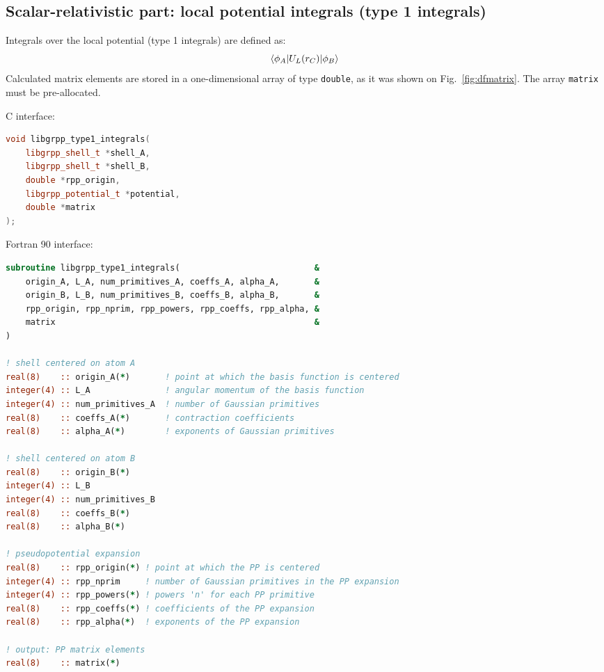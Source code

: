 \documentclass[12pt]{article}
\begin{document}
\subsection{Scalar-relativistic part: local potential integrals (type 1 integrals)}
\label{sec:type1-integrals}

Integrals over the local potential (type 1 integrals) are defined as:
%
\begin{equation}
\braket{\phi_A|U_L(r_C)|\phi_B}
\label{eq:def-type1-ints}
\end{equation}
%
Calculated matrix elements are stored in a one-dimensional array of type \texttt{double}, as it was shown on Fig.~\ref{fig:dfmatrix}. The array \texttt{matrix} must be pre-allocated.

C interface:
%
\begin{lstlisting}[language=C++]
void libgrpp_type1_integrals(
    libgrpp_shell_t *shell_A,
    libgrpp_shell_t *shell_B,
    double *rpp_origin,
    libgrpp_potential_t *potential,
    double *matrix
);
\end{lstlisting}

Fortran 90 interface:
%
\begin{lstlisting}[language=Fortran]
subroutine libgrpp_type1_integrals(                           &
    origin_A, L_A, num_primitives_A, coeffs_A, alpha_A,       &
    origin_B, L_B, num_primitives_B, coeffs_B, alpha_B,       &
    rpp_origin, rpp_nprim, rpp_powers, rpp_coeffs, rpp_alpha, &
    matrix                                                    & 
)

! shell centered on atom A
real(8)    :: origin_A(*)       ! point at which the basis function is centered
integer(4) :: L_A               ! angular momentum of the basis function
integer(4) :: num_primitives_A  ! number of Gaussian primitives
real(8)    :: coeffs_A(*)       ! contraction coefficients
real(8)    :: alpha_A(*)        ! exponents of Gaussian primitives

! shell centered on atom B
real(8)    :: origin_B(*)
integer(4) :: L_B
integer(4) :: num_primitives_B
real(8)    :: coeffs_B(*)
real(8)    :: alpha_B(*)

! pseudopotential expansion
real(8)    :: rpp_origin(*) ! point at which the PP is centered
integer(4) :: rpp_nprim     ! number of Gaussian primitives in the PP expansion
integer(4) :: rpp_powers(*) ! powers 'n' for each PP primitive
real(8)    :: rpp_coeffs(*) ! coefficients of the PP expansion
real(8)    :: rpp_alpha(*)  ! exponents of the PP expansion

! output: PP matrix elements
real(8)    :: matrix(*)
\end{lstlisting}
%
\end{document}
